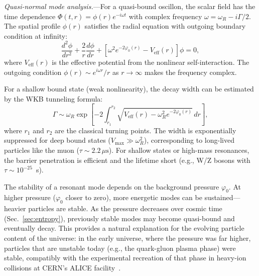 \documentclass[aps,prd,onecolumn,superscriptaddress,nofootinbib,showpacs,12pt,notitlepage]{revtex4-2}
\begin{document}
\textit{Quasi-normal mode analysis.}---For a quasi-bound
oscillon, the scalar field has the time dependence
$\Phi(t,r) = \phi(r) e^{-i\omega t}$ with complex frequency
$\omega = \omega_R - i\Gamma/2$.  The spatial profile $\phi(r)$
satisfies the radial equation with outgoing boundary condition
at infinity:
\begin{equation}\label{eq:quasi_normal}
  \frac{d^2\phi}{dr^2} + \frac{2}{r}\frac{d\phi}{dr}
  + \left[\omega^2 e^{-2\varphi_0(r)} - V_{\mathrm{eff}}(r)\right]\phi = 0,
\end{equation}
where $V_{\mathrm{eff}}(r)$ is the effective potential from
the nonlinear self-interaction.  The outgoing condition
$\phi(r) \sim e^{i\omega r}/r$ as $r \to \infty$ makes the
frequency complex.

For a shallow bound state (weak nonlinearity), the decay width
can be estimated by the WKB tunneling formula:
\begin{equation}\label{eq:gamma_wkb}
  \Gamma \sim \omega_R \exp\left[-2\int_{r_1}^{r_2}
    \sqrt{V_{\mathrm{eff}}(r) - \omega_R^2 e^{-2\varphi_0(r)}}\,dr\right],
\end{equation}
where $r_1$ and $r_2$ are the classical turning points.  The
width is exponentially suppressed for deep bound states
($V_{\mathrm{max}} \gg \omega_R^2$), corresponding to long-lived
particles like the muon ($\tau \sim 2.2\,\mu\mathrm{s}$).  For
shallow states or high-mass resonances, the barrier penetration
is efficient and the lifetime short (e.g., W/Z bosons with
$\tau \sim 10^{-25}$~s).

The stability of a resonant mode depends on the background
pressure $\varphi_0$.  At higher pressure
($\varphi_0$ closer to zero), more energetic modes can be
sustained---heavier particles are stable.  As the pressure
decreases over cosmic time (Sec.~\ref{sec:entropy}),
previously stable modes may become quasi-bound and
eventually decay.  This provides a natural explanation
for the evolving particle content of the universe:
in the early universe, where the pressure was far higher,
particles that are unstable today (e.g., the quark-gluon
plasma phase) were stable, compatibly with the
experimental recreation of that phase in heavy-ion
collisions at CERN's ALICE facility~\cite{ALICE2010}.
\end{document}
